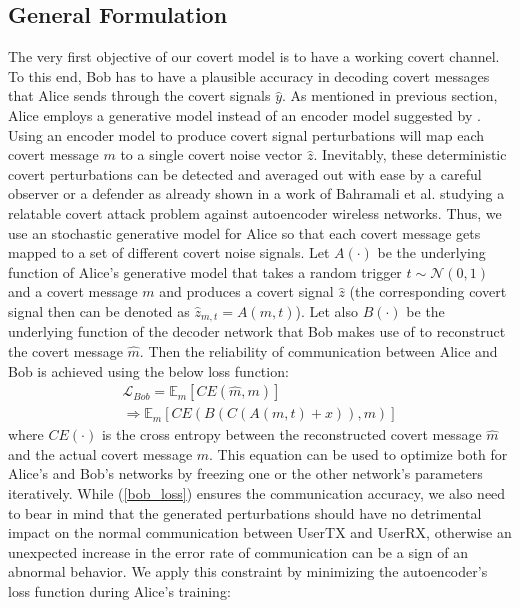\subsection{General Formulation}
The very first objective of our covert model is to have a working covert channel. To this end, Bob has to have a plausible accuracy in decoding covert messages that Alice sends through the covert signals \(\hat{y}\). As mentioned in previous section, Alice employs a generative model instead of an encoder model suggested by \cite{mohammed2021adversarial}. Using an encoder model to produce covert signal perturbations will map each covert message \(m\) to a single covert noise vector \(\hat{z}\). Inevitably, these deterministic covert perturbations can be detected and averaged out with ease by a careful observer or a defender as already shown in a work of Bahramali et al. \cite{bahramali2021robust} studying a relatable covert attack problem against autoencoder wireless networks. Thus, we use an stochastic generative model for Alice so that each covert message gets mapped to a set of different covert noise signals. Let \(A(\cdot)\) be the underlying function of Alice's generative model that takes a random trigger \(t \sim \mathcal{N}(0, 1)\) and a covert message \(m\) and produces a covert signal \(\hat{z}\) (the corresponding covert signal then can be denoted as \(\hat{z}_{m, t} = A(m, t)\)). Let also  \(B(\cdot)\) be the underlying function of the decoder network that Bob makes use of to reconstruct the covert message \(\hat{m}\). Then the reliability of communication between Alice and Bob is achieved using the below loss function:
\begin{equation}
	\begin{array}{l} \label{bob_loss}
	\mathcal{L}_{Bob} = \mathbb{E}_{m}[CE(\hat{m}, m)] \\ \Rightarrow \mathbb{E}_{m}[CE(B(C(A(m, t) + x)), m)]
	\end{array}
\end{equation}
where \(CE(\cdot)\) is the cross entropy between the reconstructed covert message \(\hat{m}\) and the actual covert message \(m\). This equation can be used to optimize both for Alice's and Bob's networks by freezing one or the other network's parameters iteratively. While (\ref{bob_loss}) ensures the communication accuracy, we also need to bear in mind that the generated perturbations should have no detrimental impact on the normal communication between UserTX and UserRX, otherwise an unexpected increase in the error rate of communication can be a sign of an abnormal behavior. We apply this constraint by minimizing the autoencoder's loss function during Alice's training:
